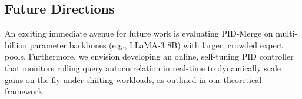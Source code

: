 \subsection{Future Directions}
An exciting immediate avenue for future work is evaluating PID-Merge on multi-billion parameter backbones (e.g., LLaMA-3 8B) with larger, crowded expert pools. Furthermore, we envision developing an online, self-tuning PID controller that monitors rolling query autocorrelation in real-time to dynamically scale gains on-the-fly under shifting workloads, as outlined in our theoretical framework.
